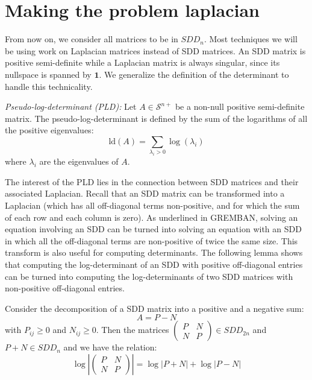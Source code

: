 
\section{Making the problem laplacian}

\label{sec:Making-the-problem}

From now on, we consider all matrices to be in $SDD_{n}$. Most techniques
we will be using work on Laplacian matrices instead of SDD matrices.
An SDD matrix is positive semi-definite while a Laplacian matrix is
always singular, since its nullspace is spanned by $\mathbf{1}$.
We generalize the definition of the determinant to handle this technicality. 

\begin{definition} \emph{Pseudo-log-determinant (PLD):} Let $A\in\mathcal{S}^{n+}$
be a non-null positive semi-definite matrix. The pseudo-log-determinant
is defined by the sum of the logarithms of all the positive eigenvalues:
\[
\text{ld}\left(A\right)=\sum_{\lambda_{i}>0}\log\left(\lambda_{i}\right)
\]
where $\lambda_{i}$ are the eigenvalues of $A$. \end{definition}

The interest of the PLD lies in the connection between SDD matrices
and their associated Laplacian. Recall that an SDD matrix can be transformed
into a Laplacian (which has all off-diagonal terms non-positive, and
for which the sum of each row and each column is zero). As underlined
in GREMBAN, solving an equation involving an SDD can be turned into
solving an equation with an SDD in which all the off-diagonal terms
are non-positive of twice the same size. This transform is also useful
for computing determinants. The following lemma shows that computing
the log-determinant of an SDD with positive off-diagonal entries can
be turned into computing the log-determinants of two SDD matrices
with non-positive off-diagonal entries.

\begin{lemma}\label{non-negative-conversion}Consider the decomposition
of a SDD matrix into a positive and a negative sum:
\[
A=P-N
\]
with $P_{ij}\geq0$ and $N_{ij}\geq0$. Then the matrices $\left(\begin{array}{cc}
P & N\\
N & P
\end{array}\right)\in SDD_{2n}$ and $P+N\in SDD_{n}$ and we have the relation:
\[
\log\left|\left(\begin{array}{cc}
P & N\\
N & P
\end{array}\right)\right|=\log\left|P+N\right|+\log\left|P-N\right|
\]


\end{lemma}


